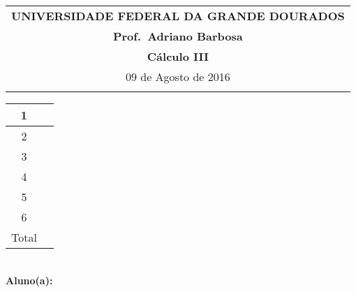 \documentclass[a4paper,5pt]{amsbook}
\begin{document}
\thispagestyle{empty}
\begin{minipage}[b]{0.45\linewidth}
\begin{tabular}{c}
\toprule{}
{{\bf UNIVERSIDADE FEDERAL DA GRANDE DOURADOS}}\\
{{\bf Prof.\ Adriano Barbosa}}\\



{{\bf C\'alculo III}}\\

\midrule{}
\hspace{8cm}09 de Agosto de 2016  \\
\bottomrule{}
\end{tabular}
%
\end{minipage} \hfill
\begin{minipage}[b]{0.58\linewidth}
\begin{flushright}
\def\arraystretch{1.2}
\begin{tabular}{|c|c|}
\hline\hline
1 & \hspace{1.2cm} \\
\hline
2& \\
\hline
3& \\
\hline
4&  \\
\hline
5&  \\
\hline
6&  \\
\hline
{\small Total}&  \\
\hline\hline
\end{tabular}
\end{flushright}
\end{minipage} \hfill
\vspace{0.3cm}\\
{\bf Aluno(a):}\dotfill{} \\
\end{document}
